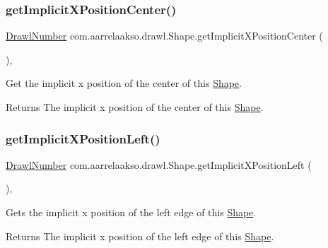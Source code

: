 \subsubsection{\texorpdfstring{get\+Implicit\+X\+Position\+Center()}{getImplicitXPositionCenter()}}
{\footnotesize\ttfamily \hyperlink{classcom_1_1aarrelaakso_1_1drawl_1_1_drawl_number}{Drawl\+Number} com.\+aarrelaakso.\+drawl.\+Shape.\+get\+Implicit\+X\+Position\+Center (\begin{DoxyParamCaption}{ }\end{DoxyParamCaption})\hspace{0.3cm}{\ttfamily [protected]}, {\ttfamily [inherited]}}



Get the implicit x position of the center of this \hyperlink{classcom_1_1aarrelaakso_1_1drawl_1_1_shape}{Shape}. 

\begin{DoxyReturn}{Returns}
The implicit x position of the center of this \hyperlink{classcom_1_1aarrelaakso_1_1drawl_1_1_shape}{Shape}. 
\end{DoxyReturn}
\mbox{\label{classcom_1_1aarrelaakso_1_1drawl_1_1_shape_a3cc59779e8ce4a98ff2309e0fb414527}} 
\subsubsection{\texorpdfstring{get\+Implicit\+X\+Position\+Left()}{getImplicitXPositionLeft()}}
{\footnotesize\ttfamily \hyperlink{classcom_1_1aarrelaakso_1_1drawl_1_1_drawl_number}{Drawl\+Number} com.\+aarrelaakso.\+drawl.\+Shape.\+get\+Implicit\+X\+Position\+Left (\begin{DoxyParamCaption}{ }\end{DoxyParamCaption})\hspace{0.3cm}{\ttfamily [protected]}, {\ttfamily [inherited]}}



Gets the implicit x position of the left edge of this \hyperlink{classcom_1_1aarrelaakso_1_1drawl_1_1_shape}{Shape}. 

\begin{DoxyReturn}{Returns}
The implicit x position of the left edge of this \hyperlink{classcom_1_1aarrelaakso_1_1drawl_1_1_shape}{Shape}. 
\end{DoxyReturn}
\mbox{\label{classcom_1_1aarrelaakso_1_1drawl_1_1_shape_aedcaf32e6be1114111e5ee2ddb1214a3}} 
